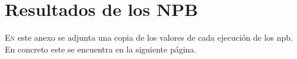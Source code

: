 \chapter{Resultados de los NPB}
\label{chap:bench_values}

\lettrine{E}{n} este anexo se adjunta una copia de los valores de cada ejecución de los \acrlong{npb}. En concreto este se encuentra en la siguiente página.

